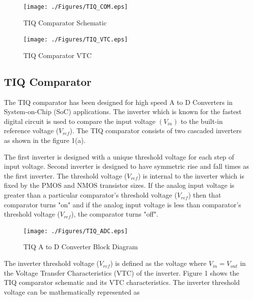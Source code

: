 \begin{figure}[ht]
\begin{minipage}[b]{0.5\linewidth}
\centering
\texttt{[image: ./Figures/TIQ\_COM.eps]}
\caption{TIQ Comparator Schematic}
\label{fig:TIQ_COM}
\end{minipage}
\hspace{0.1cm}
\begin{minipage}[b]{0.5\linewidth}
\centering
\texttt{[image: ./Figures/TIQ\_VTC.eps]}
\caption{TIQ Comparator VTC}
\label{fig:TIQ_VTC}
\end{minipage}
\end{figure}



\subsection{TIQ Comparator}

\par
\hspace{1.2cm}The TIQ comparator has been designed for high speed A to D Converters in System-on-Chip (SoC)  applications. The inverter which is known for the fastest digital circuit is used to compare the input voltage $(V_{in})$ to the built-in reference voltage ($V_{ref}$). The TIQ comparator consists of two cascaded inverters as shown in the figure 1(a).\\

\par
\hspace{0.5cm}The first inverter is designed with a unique threshold voltage for each step of input voltage. Second inverter is designed to have symmetric rise and fall times as the first inverter. The threshold voltage ($V_{ref}$) is internal to the inverter which is fixed by the PMOS and NMOS transistor sizes. If the analog input voltage is greater than a particular comparator's threshold voltage ($V_{ref}$) then that comparator turns "on" and if the analog input voltage is less than comparator's threshold voltage ($V_{ref}$), the comparator turns "off".\\

\begin{figure}[ht]
\begin{center}
\texttt{[image: ./Figures/TIQ\_ADC.eps]}
\caption{TIQ A to D Converter Block Diagram }
\label{fig:TIQ_ADC}
\end{center}
\end{figure}

\par
\hspace{0.5cm}The inverter threshold voltage ($V_{ref}$) is defined as the voltage where $V_{in}=V_{out}$ in the Voltage Transfer Characteristics (VTC) of the inverter. Figure 1 shows the TIQ comparator schematic and its VTC characteristics. The inverter threshold voltage can be mathematically represented as

